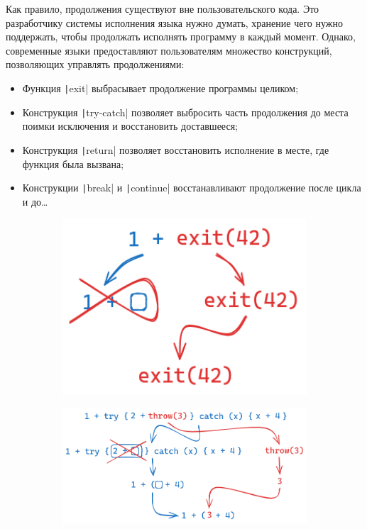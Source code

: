 Как правило, продолжения существуют вне пользовательского кода.
Это разработчику системы исполнения языка нужно думать, хранение чего нужно поддержать, чтобы продолжать исполнять программу в каждый момент.
Однако, современные языки предоставляют пользователям множество конструкций, позволяющих управлять продолжениями:

\begin{itemize}
    \item Функция \texttt|exit| выбрасывает продолжение программы целиком;
    \item Конструкция \texttt|try-catch| позволяет выбросить часть продолжения до места поимки исключения и восстановить доставшееся;
    \item Конструкция \texttt|return| позволяет восстановить исполнение в месте, где функция была вызвана;
    \item Конструкции \texttt|break| и \texttt|continue| восстанавливают продолжение после цикла и до\ldots
\end{itemize}

\begin{figure}[h]
    \centering
    \begin{subfigure}[h]{0.29\linewidth}
        \includegraphics[width=1\textwidth]{figs/cont-exit}
    \end{subfigure}
    \begin{subfigure}[h]{0.7\linewidth}
        \includegraphics[width=1\textwidth]{figs/cont-try-catch}
    \end{subfigure}
\end{figure}

